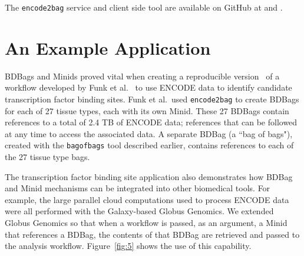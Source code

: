 \documentclass[11pt]{article}
\begin{document}
The \texttt{encode2bag} service and client side tool are available on GitHub at
 and 
.

\vspace{2ex}

\noindent{}


\section{An Example Application}

BDBags and Minids proved vital when creating a reproducible version~\cite{madduri2018reproducible}
of a workflow developed by Funk et al.~\cite{funk18} to use ENCODE data to identify candidate
transcription factor binding sites. 
Funk et al.\ used \texttt{encode2bag} to create BDBags for each of 27 tissue types, each with its own Minid.
These 27 BDBags contain references to a total of 2.4 TB of ENCODE data;
references that can be followed at any time to access the associated data.
A separate BDBag (a ``bag of bags"), created with the \texttt{bagofbags} tool described earlier,
contains references to each of the 27 tissue type bags.

The transcription factor binding site application also demonstrates how BDBag and Minid mechanisms
can be integrated into other biomedical tools.
For example, the large parallel cloud computations used to process ENCODE data were all performed
with the Galaxy-based Globus Genomics.
We extended Globus Genomics so that when a workflow is passed, as an argument, a Minid 
that references a BDBag, 
the contents of that BDBag are retrieved and passed to the analysis workflow.
Figure~\ref{fig:5} shows the use of this capability.

\vspace{2ex}

\noindent{}
\end{document}
